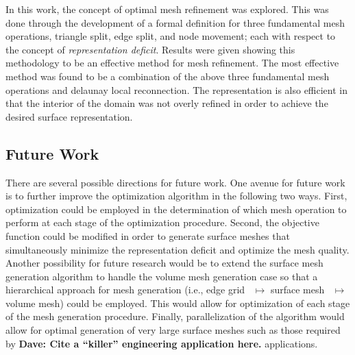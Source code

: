 In this work, the concept of optimal mesh refinement was explored. This
was done through the development of a formal definition for three
fundamental mesh operations, triangle split, edge split, and node
movement; each with respect to the concept of {\it representation
deficit}. Results were given showing this methodology to be an effective
method for mesh refinement. The most effective method was found to be a
combination of the above three fundamental mesh operations and delaunay
local reconnection. The representation is also efficient in that the
interior of the domain was not overly refined in order to achieve the
desired surface representation.

\subsection{Future Work}
There are several possible directions for future work.  One avenue for
future work is to further improve the optimization algorithm in the
following two ways.  First, optimization could be employed in the
determination of which mesh operation to perform at each stage of the
optimization procedure.  Second, the objective function could be
modified in order to generate surface meshes that simultaneously
minimize the representation deficit and optimize the mesh quality.
Another possibility for future research would be to extend the surface
mesh generation algorithm to handle the volume mesh generation case so
that a hierarchical approach for mesh generation (i.e., edge
grid~\cite{mclaurin13} $\mapsto$ surface mesh~\cite{mclaurin14}
$\mapsto$ volume mesh) could be employed. This would allow for
optimization of each stage of the mesh generation procedure.  Finally,
parallelization of the algorithm would allow for optimal generation of
very large surface meshes such as those required by {\bf{Dave:  Cite a
``killer'' engineering application here.}} applications.
